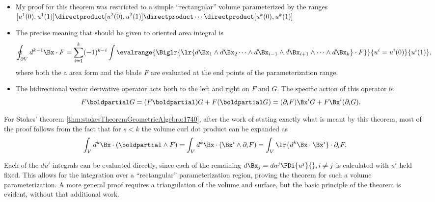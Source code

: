 \begin{itemize}
\item My proof for this theorem was restricted to a simple ``rectangular'' volume parameterized by the ranges
   \(
   [u^1(0), u^1(1) ] \directproduct
   [u^2(0), u^2(1) ] \directproduct \cdots \directproduct
   [u^k(0), u^k(1) ] \)
\item The precise meaning that should be given to oriented area integral is
\begin{dmath}\label{eqn:fundamentalTheoremOfCalculus:140}
\oint_{\partial V} d^{k-1} \Bx \cdot F
=
\sum_{i = 1}^k (-1)^{k-i} \int \evalrange{
   \Biglr{ \lr{ d\Bx_1 \wedge d\Bx_2 \cdots \wedge d\Bx_{i-1} \wedge d\Bx_{i+1} \wedge \cdots \wedge d\Bx_k } \cdot F }
}{u^i = u^i(0)}{u^i(1)},
\end{dmath}
where both the a area form and the blade \( F \) are evaluated at the end points of the parameterization range.
\item
The bidirectional vector derivative operator acts both to the left and right on \( F \) and \( G \).
The specific action of this operator is
\begin{dmath}\label{eqn:fundamentalTheoremOfCalculus:240}
F \boldpartial G
=
(F \boldpartial) G
+
F (\boldpartial G)
=
(\partial_i F) \Bx^i G
+
F \Bx^i (\partial_i G).
\end{dmath}
\end{itemize}

For Stokes' theorem \cref{thm:stokesTheoremGeometricAlgebra:1740}, after the work of stating exactly what is meant by this theorem, most of the proof follows from the fact that for \( s < k \) the volume curl dot product can be expanded as
\begin{dmath}\label{eqn:fundamentalTheoremOfCalculus:160}
\int_V d^k \Bx \cdot (\boldpartial \wedge F) =
\int_V d^k \Bx \cdot (\Bx^i \wedge \partial_i F) =
\int_V \lr{ d^k \Bx \cdot \Bx^i } \cdot \partial_i F.
\end{dmath}

Each of the \(du^i\) integrals can be evaluated directly, since each of the remaining \(d\Bx_j = du^j \PDi{u^j}{}, i \ne j \) is calculated with \( u^i \) held fixed.
This allows for the integration over a ``rectangular'' parameterization region, proving the theorem for such a volume parameterization.
A more general proof requires a triangulation of the volume and surface, but the basic principle of the theorem is evident, without that additional work.

